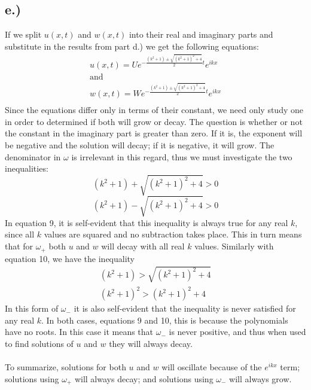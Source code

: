\documentclass{article}
\begin{document}
\subsection*{e.)}
If we split $u(x, t)$ and $w(x,t)$ into their real and imaginary parts and substitute in the results from part d.) we get the following equations:
\begin{equation}
\begin{aligned}
u(x, t) = Ue^{-\frac{(k^2 + 1) \pm \sqrt{(k^2 + 1)^2 +4}}{2}t}e^{ikx}\\
\text{and}\\
w(x, t) = We^{-\frac{(k^2 + 1) \pm \sqrt{(k^2 + 1)^2 +4}}{2}t}e^{ikx}\\
\end{aligned}
\end{equation}
Since the equations differ only in terms of their constant, we need only study one in order to determined if both will grow or decay. The question is whether or not the constant in the imaginary part is greater than zero. If it is, the exponent will be negative and the solution will decay; if it is negative, it will grow. The denominator in $\omega$ is irrelevant in this regard, thus we must investigate the two inequalities:
\begin{equation}
(k^2 + 1) + \sqrt{(k^2 + 1)^2 +4} > 0
\end{equation}
\begin{equation}
(k^2 + 1) - \sqrt{(k^2 + 1)^2 +4} > 0
\end{equation}
In equation 9, it is self-evident that this inequality is always true for any real $k$, since all $k$ values are squared and no subtraction takes place. This in turn means that for $\omega_+$ both $u$ and $w$ will decay with all real $k$ values.
Similarly with equation 10, we have the inequality
\begin{equation}
\begin{aligned}
(k^2 + 1) > \sqrt{(k^2 + 1)^2 +4}\\
(k^2 + 1)^2 > (k^2 +1)^2 + 4
\end{aligned}
\end{equation}
In this form of $\omega_-$ it is also self-evident that the inequality is never satisfied for any real $k$. In both cases, equations 9 and 10, this is because the polynomials have no roots. In this case it means that $\omega_-$ is never positive, and thus when used to find solutions of $u$ and $w$ they will always decay.
\\
\\
To summarize, solutions for both $u$ and $w$ will oscillate because of the $e^{ikx}$ term; solutions using $\omega_+$ will always decay; and solutions using $\omega_-$ will always grow.
\end{document}
